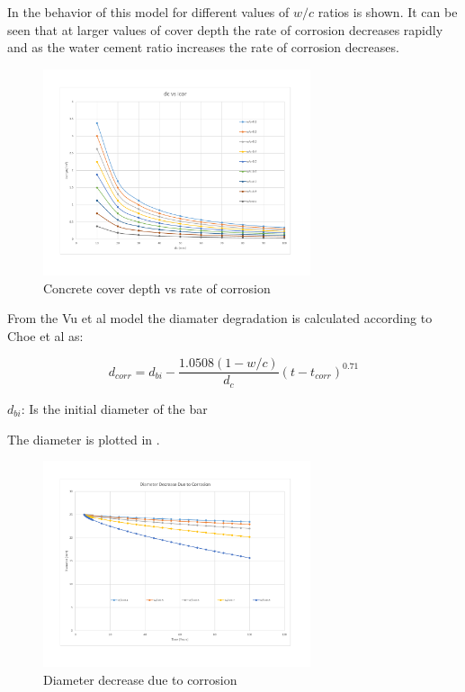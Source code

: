 In  the behavior of this model for different values of $w/c$ ratios is shown. It can be seen that at larger values of cover depth the rate of corrosion decreases rapidly and as the water cement ratio increases the rate of corrosion decreases.
%
\begin{figure}[htbp]
\centering
\includegraphics[width=0.7\textwidth]{Chapter-1/figs/dcvsicor}
\caption{Concrete cover depth vs rate of corrosion}
\label{fig:hist1}
\end{figure}

From the Vu et al model the diamater degradation is calculated according to Choe et al as:

\begin{equation}
  d_{corr}=d_{bi}-\frac{1.0508(1-w/c)}{d_c} (t-t_{corr})^{0.71}
  \label{eq.nine}
\end{equation} 

$d_{bi}$: Is the initial diameter of the bar

The diameter is plotted in .

\begin{figure}[htbp]
\centering
\includegraphics[width=0.7\textwidth]{Chapter-1/figs/DiameterDecrease}
\caption{Diameter decrease due to corrosion}
\label{fig:hist2}
\end{figure}

